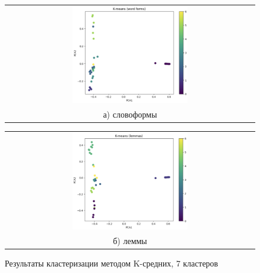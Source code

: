 \begin{figure}
	\begin{tabular}[b]{c}
		\includegraphics[width=0.475\textwidth]{images/5.png} \\
		\small а) словоформы
	\end{tabular}
	\begin{tabular}[b]{c}
		\includegraphics[width=0.475\textwidth]{images/6.png} \\
		\small б) леммы
	\end{tabular}
	\caption{Результаты кластеризации методом K-средних, 7 кластеров}
	\label{img:3}
\end{figure}

